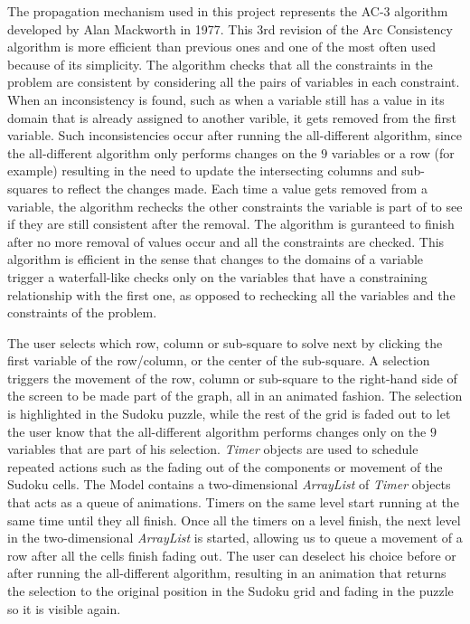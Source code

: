 \documentclass{l4proj}
\begin{document}
\noindent The propagation mechanism used in this project represents the AC-3 algorithm developed by Alan Mackworth \cite{mackworth1977consistency} in 1977. This 3rd revision of the Arc Consistency algorithm is more efficient than previous ones and one of the most often used because of its simplicity. The algorithm checks that all the constraints in the problem are consistent by considering all the pairs of variables in each constraint. When an inconsistency is found, such as when a variable still has a value in its domain that is already assigned to another varible, it gets removed from the first variable. Such inconsistencies occur after running the all-different algorithm, since the all-different algorithm only performs changes on the $9$ variables or a row (for example) resulting in the need to update the intersecting columns and sub-squares to reflect the changes made. Each time a value gets removed from a variable, the algorithm rechecks the other constraints the variable is part of to see if they are still consistent after the removal. The algorithm is guranteed to finish after no more removal of values occur and all the constraints are checked. This algorithm is efficient in the sense that changes to the domains of a variable trigger a waterfall-like checks only on the variables that have a constraining relationship with the first one, as opposed to rechecking all the variables and the constraints of the problem.

\noindent The user selects which row, column or sub-square to solve next by clicking the first variable of the row/column, or the center of the sub-square. A selection triggers the movement of the row, column or sub-square to the right-hand side of the screen to be made part of the graph, all in an animated fashion. The selection is highlighted in the Sudoku puzzle, while the rest of the grid is faded out to let the user know that the all-different algorithm performs changes only on the $9$ variables that are part of his selection. \textit{Timer} objects are used to schedule repeated actions such as the fading out of the components or movement of the Sudoku cells. The Model contains a two-dimensional \textit{ArrayList} of \textit{Timer} objects that acts as a queue of animations. Timers on the same level start running at the same time until they all finish. Once all the timers on a level finish, the next level in the two-dimensional \textit{ArrayList} is started, allowing us to queue a movement of a row after all the cells finish fading out. The user can deselect his choice before or after running the all-different algorithm, resulting in an animation that returns the selection to the original position in the Sudoku grid and fading in the puzzle so it is visible again.
\end{document}
